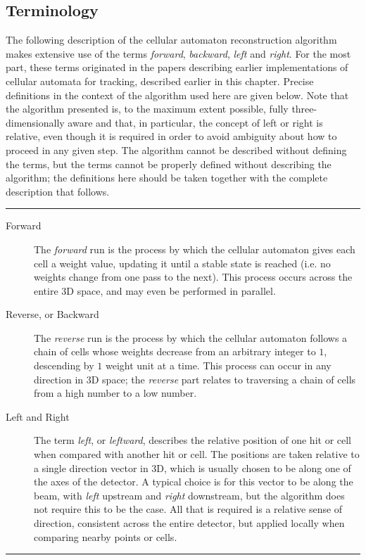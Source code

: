 \subsection{Terminology}
The following description of the cellular automaton reconstruction algorithm makes extensive use of the terms \emph{forward}, \emph{backward}, \emph{left} and \emph{right}. For the most part, these terms originated in the papers describing earlier implementations of cellular automata for tracking, described earlier in this chapter. Precise definitions in the context of the algorithm used here are given below. Note that the algorithm presented is, to the maximum extent possible, fully three-dimensionally aware and that, in particular, the concept of left or right is relative, even though it is required in order to avoid ambiguity about how to proceed in any given step. The algorithm cannot be described without defining the terms, but the terms cannot be properly defined without describing the algorithm; the definitions here should be taken together with the complete description that follows.

\vspace{1em}\hrule\vspace{1em}
\begin{description}
    \item[Forward]
        The \emph{forward} run is the process by which the cellular automaton gives each cell a weight value, updating it until a stable state is reached (i.e. no weights change from one pass to the next). This process occurs across the entire 3D space, and may even be performed in parallel.
    
    \item[Reverse, or Backward]
        The \emph{reverse} run is the process by which the cellular automaton follows a chain of cells whose weights decrease from an arbitrary integer to $1$, descending by $1$ weight unit at a time. This process can occur in any direction in 3D space; the \emph{reverse} part relates to traversing a chain of cells from a high number to a low number.

    \item[Left and Right]
        The term \emph{left}, or \emph{leftward}, describes the relative position of one hit or cell when compared with another hit or cell. The positions are taken relative to a single direction vector in 3D, which is usually chosen to be along one of the axes of the detector. A typical choice is for this vector to be along the beam, with \emph{left} upstream and \emph{right} downstream, but the algorithm does not require this to be the case. All that is required is a relative sense of direction, consistent across the entire detector, but applied locally when comparing nearby points or cells.
\end{description}
\vspace{1em}\hrule\vspace{1em}


